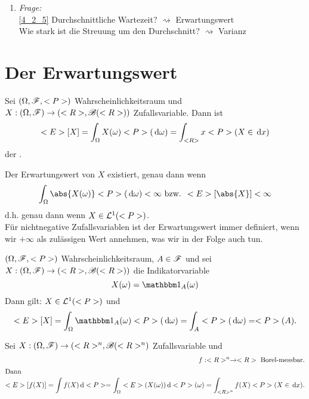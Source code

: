 \begin{enumerate}
	\item \emph{Frage:} \\
	\cref{4_2_5} Durchschnittliche Wartezeit? $\rightsquigarrow$ Erwartungswert\\
	Wie stark ist die Streuung um den Durchschnitt? $\rightsquigarrow$ Varianz
\end{enumerate}
\section{Der Erwartungswert}
\begin{definition}[Erwartungswert]
	Sei $(\Omega, \mathscr F, <P>)$ Wahrscheinlichkeitsraum und $X: (\Omega, \mathscr F) \to (<R>, \mathscr{B}(<R>))$ Zufallsvariable. Dann ist
	\begin{align*}
		<E>[X] = \int_{\Omega} X(\omega) <P>(\,\mathrm{d} \omega) = \int_{<R>} x <P>(X  \in \,\mathrm{d} x)
	\end{align*}
	der .
\end{definition}
\begin{*hint}
	Der Erwartungswert von $X$ existiert, genau dann wenn
	\begin{align*}
		\int_{\O} \abs{X(\omega)}\P(\d \omega) < \infty \bzw \E[\abs{X}] < \infty
	\end{align*}
	d.h. genau dann wenn $X \in \mathcal{L}^{1} (<P>)$.\\
	Für nichtnegative Zufallsvariablen ist der Erwartungswert immer definiert, wenn wir $+\infty$ als zulässigen Wert annehmen, was wir in der Folge auch tun.
\end{*hint}
\begin{example}
	$(\Omega, \mathscr F, <P>)$ Wahrscheinlichkeitsraum, $A \in \mathscr F$ und sei $X: (\Omega, \mathscr F) \to (<R>, \mathscr{B}(<R>))$ die Indikatorvariable %
	\[
		X(\omega) = \indi_{A} (\omega)
	\]
	Dann gilt: $X \in \mathcal{L}^{1}(<P>)$ und
	\begin{align*}
		\E[X] = \int_{\O} \indi_{A} (\omega) \P(\d \omega) = \int_{A} \P(\d \omega) = \P(A).
	\end{align*}
\end{example}
\begin{proposition}
	Sei $X: (\Omega, \mathscr F) \to (<R>^n, \mathscr{B}(<R>^n)$ Zufallsvariable und
	\begin{align*}
		f: <R>^n \to <R> \text{ Borel-messbar}.\\
		\intertext{Dann}
		<E>[f(X)] = \int f(X)\,\mathrm{d} <P> = \int_{\Omega} <E>(X(\omega)) \,\mathrm{d} <P>(\omega) = \int_{<R>^n} f(X) <P>(X \in \,\mathrm{d} x). 
	\end{align*}
\end{proposition}
